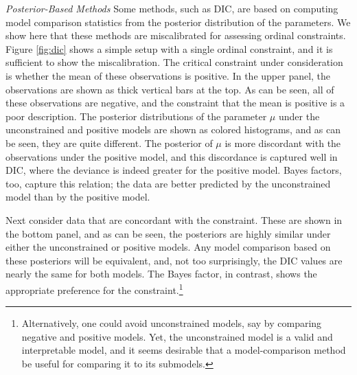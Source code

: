 \documentclass[english,man]{apa6}
\theoremstyle{definition}
\theoremstyle{definition}
\theoremstyle{definition}
\theoremstyle{remark}
\begin{document}
\emph{Posterior-Based Methods} Some methods, such as DIC, are based on
computing model comparison statistics from the posterior distribution of
the parameters. We show here that these methods are miscalibrated for
assessing ordinal constraints. Figure \ref{fig:dic} shows a simple setup
with a single ordinal constraint, and it is sufficient to show the
miscalibration. The critical constraint under consideration is whether
the mean of these observations is positive. In the upper panel, the
observations are shown as thick vertical bars at the top. As can be
seen, all of these observations are negative, and the constraint that
the mean is positive is a poor description. The posterior distributions
of the parameter \(\mu\) under the unconstrained and positive models are
shown as colored histograms, and as can be seen, they are quite
different. The posterior of \(\mu\) is more discordant with the
observations under the positive model, and this discordance is captured
well in DIC, where the deviance is indeed greater for the positive
model. Bayes factors, too, capture this relation; the data are better
predicted by the unconstrained model than by the positive model.

Next consider data that are concordant with the constraint. These are
shown in the bottom panel, and as can be seen, the posteriors are highly
similar under either the unconstrained or positive models. Any model
comparison based on these posteriors will be equivalent, and, not too
surprisingly, the DIC values are nearly the same for both models. The
Bayes factor, in contrast, shows the appropriate preference for the
constraint.\footnote{Alternatively, one could avoid unconstrained
  models, say by comparing negative and positive models. Yet, the
  unconstrained model is a valid and interpretable model, and it seems
  desirable that a model-comparison method be useful for comparing it to
  its submodels.}
\end{document}
